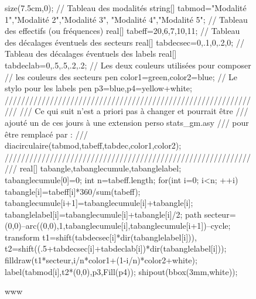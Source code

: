 \documentclass[]{article}
\begin{document}
\begin{figure}[!ht]
	\centering
	\begin{asy}
	size(7.5cm,0);
// Tableau des modalités
string[] tabmod={"Modalit\'e 1","Modalit\'e 2","Modalit\'e 3",
                 "Modalit\'e 4","Modalit\'e 5"};
// Tableau des effectifs (ou fréquences)
real[] tabeff={20,6,7,10,11};
// Tableau des décalages éventuels des secteurs
real[] tabdecsec={0,.1,0,.2,0};
// Tableau des décalages éventuels des labels
real[] tabdeclab={0,.5,.5,.2,.2};
// Les deux couleurs utilisées pour composer
// les couleurs des secteurs
pen color1=green,color2=blue;
// Le stylo pour les labels
pen p3=blue,p4=yellow+white;
///////////////////////////////////////////////////////////////
/// Ce qui suit n'est a priori pas à changer et pourrait être
/// ajouté un de ces jours à une extension perso stats_gm.asy
/// pour être remplacé par :
/// diacirculaire(tabmod,tabeff,tabdec,color1,color2);
///////////////////////////////////////////////////////////////
real[] tabangle,tabanglecumule,tabanglelabel;
tabanglecumule[0]=0;
int n=tabeff.length;
for(int i=0; i<n; ++i) {
  tabangle[i]=tabeff[i]*360/sum(tabeff);
  tabanglecumule[i+1]=tabanglecumule[i]+tabangle[i];
  tabanglelabel[i]=tabanglecumule[i]+tabangle[i]/2;
  path secteur=(0,0)--arc((0,0),1,tabanglecumule[i],tabanglecumule[i+1])--cycle;
  transform t1=shift(tabdecsec[i]*dir(tabanglelabel[i])),
            t2=shift((.5+tabdecsec[i]+tabdeclab[i])*dir(tabanglelabel[i]));
  filldraw(t1*secteur,i/n*color1+(1-i/n)*color2+white);
  label(tabmod[i],t2*(0,0),p3,Fill(p4));
}
shipout(bbox(3mm,white));
	\end{asy}
	\caption{www}
\end{figure}
\end{document}
